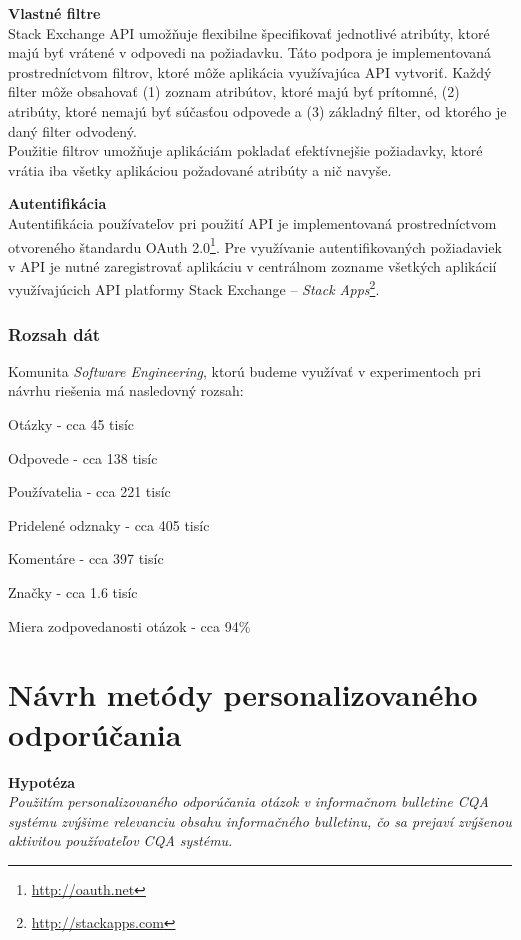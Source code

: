 \textbf{Vlastné filtre}\\
Stack Exchange API umožňuje flexibilne špecifikovať jednotlivé atribúty, ktoré majú byť vrátené v odpovedi na požiadavku.
Táto podpora je implementovaná prostredníctvom filtrov, ktoré môže aplikácia využívajúca API vytvoriť. Každý filter môže
obsahovať (1) zoznam atribútov, ktoré majú byť prítomné, (2) atribúty, ktoré nemajú byť súčasťou odpovede a (3) základný
filter, od ktorého je daný filter odvodený.\\
Použitie filtrov umožňuje aplikáciám pokladať efektívnejšie požiadavky, ktoré vrátia iba všetky aplikáciou požadované
atribúty a nič navyše.

\textbf{Autentifikácia}\\
Autentifikácia používateľov pri použití API je implementovaná prostredníctvom otvoreného štandardu
OAuth 2.0\footnote{\url{http://oauth.net}}. Pre využívanie autentifikovaných požiadaviek v API je nutné zaregistrovať
aplikáciu v centrálnom zozname všetkých aplikácií využívajúcich API platformy Stack Exchange --
\textit{Stack Apps}\footnote{\url{http://stackapps.com}}.

\subsubsection{Rozsah dát}

Komunita \textit{Software Engineering}, ktorú budeme využívať v experimentoch pri návrhu riešenia má nasledovný rozsah:

\begin{my_itemize}
    \item{Otázky - cca 45 tisíc}
    \item{Odpovede - cca 138 tisíc}
    \item{Používatelia - cca 221 tisíc}
    \item{Pridelené odznaky - cca 405 tisíc}
    \item{Komentáre - cca 397 tisíc}
    \item{Značky - cca 1.6 tisíc}
    \item{Miera zodpovedanosti otázok - cca 94\%}
\end{my_itemize}


\section{Návrh metódy personalizovaného odporúčania}

\textbf{Hypotéza}\\
\textit{Použitím personalizovaného odporúčania otázok v informačnom bulletine CQA systému zvýšime relevanciu obsahu informačného
bulletinu, čo sa prejaví zvýšenou aktivitou používateľov CQA systému.}

